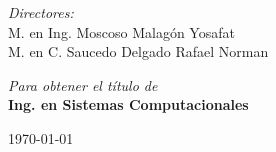 \documentclass[11pt,letter]{report}
\begin{document}
\begin{center}
\begin{minipage}{0.46\textwidth}
\begin{flushleft}
\end{flushleft}
\end{minipage}
\begin{minipage}{0.52\textwidth}		
\vspace{-0.6cm}
\begin{flushright} \large
\emph{Directores:} \\
M. en Ing. Moscoso Malagón Yosafat\\
M. en C. Saucedo Delgado Rafael Norman
\end{flushright}
\end{minipage}
\vspace*{1cm}
\vspace{1cm}	
\emph{Para obtener el t\'itulo de }\\
\vspace{1cm}	
{\textbf{\Large Ing. en Sistemas Computacionales}	}\\
\vspace{1cm}
\begin{center}
{\large \today}
\end{center}											  						
\end{center}
\end{document}
